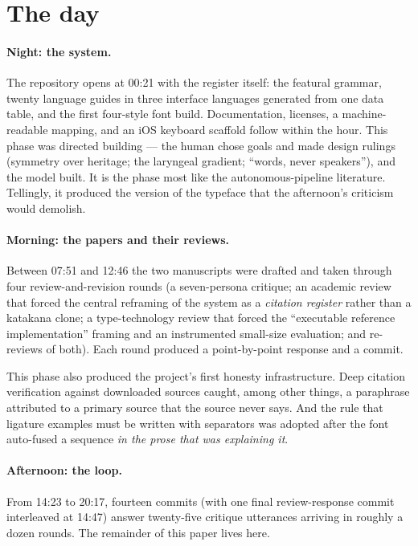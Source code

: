 \documentclass[11pt]{article}
\begin{document}
\section{The day}\label{sec:day}

\paragraph{Night: the system.} The repository opens at 00:21 with the register itself: the featural grammar, twenty language guides in three interface languages generated from one data table, and the first four-style font build. Documentation, licenses, a machine-readable mapping, and an iOS keyboard scaffold follow within the hour. This phase was directed building — the human chose goals and made design rulings (symmetry over heritage; the laryngeal gradient; ``words, never speakers''), and the model built. It is the phase most like the autonomous-pipeline literature. Tellingly, it produced the version of the typeface that the afternoon's criticism would demolish.

\paragraph{Morning: the papers and their reviews.} Between 07:51 and 12:46 the two manuscripts were drafted and taken through four review-and-revision rounds (a seven-persona critique; an academic review that forced the central reframing of the system as a \emph{citation register} rather than a katakana clone; a type-technology review that forced the ``executable reference implementation'' framing and an instrumented small-size evaluation; and re-reviews of both). Each round produced a point-by-point response and a commit.

This phase also produced the project's first honesty infrastructure. Deep citation verification against downloaded sources caught, among other things, a paraphrase attributed to a primary source that the source never says. And the rule that ligature examples must be written with separators was adopted after the font auto-fused a sequence \emph{in the prose that was explaining it}.

\paragraph{Afternoon: the loop.} From 14:23 to 20:17, fourteen commits (with one final review-response commit interleaved at 14:47) answer twenty-five critique utterances arriving in roughly a dozen rounds. The remainder of this paper lives here.
\end{document}
